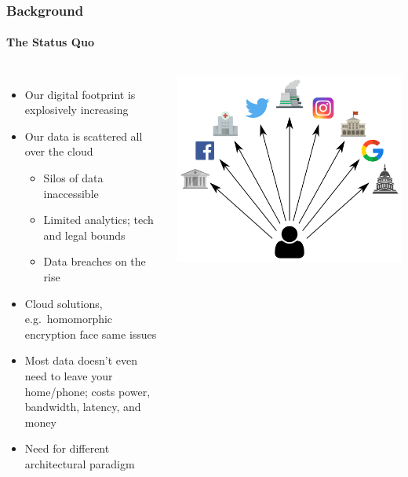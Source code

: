 \documentclass[aspectratio=169]{beamer}
\begin{document}
\begin{frame}
	\frametitle{Background}
	\framesubtitle{The Status Quo}
	\begin{columns}[c]
		\begin{itemize}
			\item Our digital footprint is explosively increasing
			\item Our data is scattered all over the cloud
			\begin{itemize}
				\item Silos of data inaccessible
				\item Limited analytics; tech and legal bounds
				\item Data breaches on the rise
			\end{itemize}
			\item Cloud solutions, e.g.\ homomorphic encryption face same issues
			\item Most data doesn't even need to leave your home/phone; costs power, bandwidth, latency, and money
			\item Need for different architectural paradigm
		\end{itemize}
		\centering
		\includegraphics[width=\textwidth]{third-parties}
	\end{columns}
\end{frame}
\end{document}
